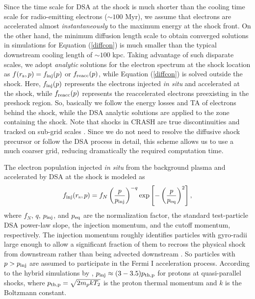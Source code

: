 \documentclass[twocolumn]{aastex61}
\begin{document}
Since the time scale for DSA at the shock is much shorter than the cooling time scale for radio-emitting electrons ($\sim 100$ Myr),
we assume that electrons are accelerated almost {\it instantaneously} to the maximum energy at the shock front.
On the other hand, the minimum diffusion length scale to obtain converged
solutions in simulations for Equation (\ref{diffcon}) is much smaller than the typical downstream cooling length of $\sim 100$ kpc.
Taking advantage of such disparate scales, we adopt {\it analytic} solutions for the electron spectrum at the shock location as
$f(r_{\rm s},p)= f_{\rm inj}(p)$ or $f_{\rm reacc}(p)$,
while Equation (\ref{diffcon}) is solved outside the shock.
Here, $f_{\rm inj}(p)$ represents the electrons injected {\it in situ} and accelerated at the shock, 
while $f_{\rm reacc}(p)$ represents the reaccelerated electrons preexisting in the preshock region.
So, basically we follow the energy losses and TA of electrons behind the shock,
while the DSA analytic solutions are applied to the zone containing the shock. Note that shocks in CRASH are true discontinuities and tracked on sub-grid scales \citep{kj06}.
Since we do not need to resolve the diffusive shock precursor or follow the DSA process in detail,
this scheme allows us to use a much coarser grid, reducing dramatically the required computation time.

The electron population injected {\it in situ} from the background plasma and accelerated by DSA at the shock is modeled as
\begin{equation}
f_{\rm inj}(r_{\rm s}, p)= f_N \left({p \over p_{\rm inj}}\right)^{-q} \exp \left[-\left({p \over p_{\rm eq}}\right)^2\right],
\label{finj}
\end{equation}
where $f_N$, $q$, $p_{\rm inj}$, and $p_{\rm eq}$ are the normalization factor, the standard test-particle DSA power-law slope,
the injection momentum, and the cutoff momentum, respectively.
The injection momentum roughly identifies particles with gyro-radii large enough to allow a significant fraction 
of them to recross the physical shock from downstream rather than being advected downstream 
\citep[e.g.,][]{gieseler2000, kjg02, caprioli15}.
So particles with $p>p_{\rm inj}$ are assumed to participate in the Fermi I acceleration process.
According to the hybrid simulations by \citet{caprioli14}, $p_{\rm inj}\approx (3-3.5)p_{\rm th,p}$ 
for protons at quasi-parallel shocks, where $p_{\rm th,p}=\sqrt{2m_p k T_2}$ is the proton thermal momentum
and $k$ is the Boltzmann constant.
\end{document}
